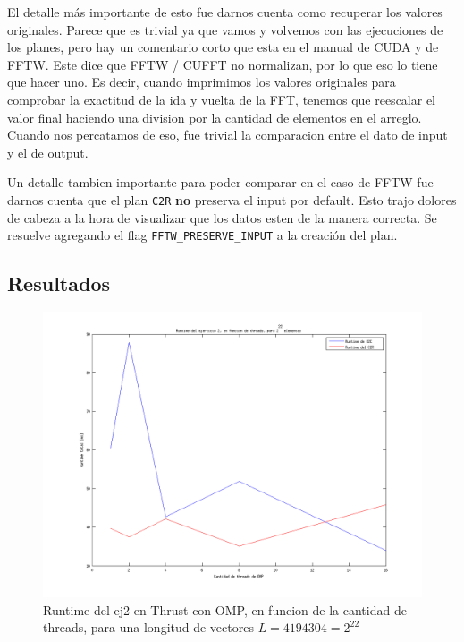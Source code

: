 El detalle m\'as importante de esto fue darnos cuenta como recuperar los valores originales. Parece que es trivial
ya que vamos y volvemos con las ejecuciones de los planes, pero hay un comentario corto que esta en el manual de CUDA y de 
FFTW. Este dice que FFTW / CUFFT no normalizan, por lo que eso lo tiene que hacer uno. Es decir, cuando imprimimos
los valores originales para comprobar la exactitud de la ida y vuelta de la FFT, tenemos que reescalar el valor
final haciendo una division por la cantidad de elementos en el arreglo. Cuando nos percatamos de eso, fue trivial
la comparacion entre el dato de input y el de output.

Un detalle tambien importante para poder comparar en el caso de FFTW fue darnos cuenta que el plan \texttt{C2R} 
\textbf{no} preserva el input por default. Esto trajo dolores de cabeza a la hora de visualizar que los 
datos esten de la manera correcta. Se resuelve agregando el flag \texttt{FFTW\_PRESERVE\_INPUT} a la creaci\'on
del plan.

\subsection{Resultados}

  \begin{figure}[H]
 \begin {center}
 \includegraphics[width=\hrwidth]{plots/ej2omp.png}
 \end {center}
 \caption{Runtime del ej2 en Thrust con OMP, en funcion de la cantidad de threads, para una longitud de vectores $L=4194304=2^{22}$}
 \label{fig:ej1OMP}
 \end{figure}

